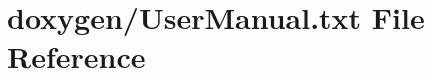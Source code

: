 \hypertarget{UserManual_8txt}{\section{doxygen/\+User\+Manual.txt File Reference}
\label{UserManual_8txt}
}
